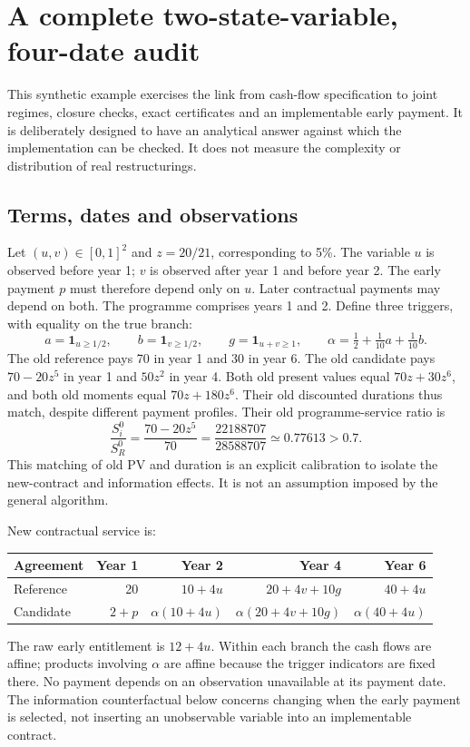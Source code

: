 \documentclass[11pt,a4paper]{article}
\begin{document}
\section{A complete two-state-variable, four-date audit}\label{sec:multi}
This synthetic example exercises the link from cash-flow specification to joint regimes, closure checks, exact certificates and an implementable early payment. It is deliberately designed to have an analytical answer against which the implementation can be checked. It does not measure the complexity or distribution of real restructurings.

\subsection{Terms, dates and observations}
Let $(u,v)\in[0,1]^2$ and $z=20/21$, corresponding to 5\%. The variable $u$ is observed before year 1; $v$ is observed after year 1 and before year 2. The early payment $p$ must therefore depend only on $u$. Later contractual payments may depend on both. The programme comprises years 1 and 2. Define three triggers, with equality on the true branch:
\[
a=\mathbf1_{u\geq1/2},\qquad b=\mathbf1_{v\geq1/2},\qquad
g=\mathbf1_{u+v\geq1},\qquad\alpha=\tfrac12+\tfrac1{10}a+\tfrac1{10}b.
\]
The old reference pays 70 in year 1 and 30 in year 6. The old candidate pays $70-20z^5$ in year 1 and $50z^2$ in year 4. Both old present values equal $70z+30z^6$, and both old moments equal $70z+180z^6$. Their old discounted durations thus match, despite different payment profiles. Their old programme-service ratio is
\[
\frac{S_i^0}{S_R^0}=\frac{70-20z^5}{70}
=\frac{22188707}{28588707}\simeq0.77613>0.7.
\]
This matching of old PV and duration is an explicit calibration to isolate the new-contract and information effects. It is not an assumption imposed by the general algorithm.

New contractual service is:
\begin{center}
\begin{tabular}{lrrrr}\toprule
Agreement &Year 1&Year 2&Year 4&Year 6\\\midrule
Reference&20&$10+4u$&$20+4v+10g$&$40+4u$\\
Candidate&$2+p$&$\alpha(10+4u)$&$\alpha(20+4v+10g)$&$\alpha(40+4u)$\\\bottomrule
\end{tabular}
\end{center}
The raw early entitlement is $12+4u$. Within each branch the cash flows are affine; products involving $\alpha$ are affine because the trigger indicators are fixed there. No payment depends on an observation unavailable at its payment date. The information counterfactual below concerns changing when the early payment is selected, not inserting an unobservable variable into an implementable contract.
\end{document}
